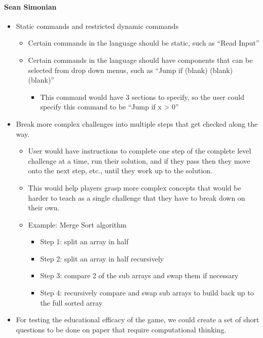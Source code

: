 \paragraph{Sean Simonian}
\begin{itemize}
  \item Static commands and restricted dynamic commands
  \begin{itemize}
    \item Certain commands in the language should be static, such as “Read
    Input”
    \item Certain commands in the language should have components that can be
    selected from drop down menus, such as “Jump if (blank) (blank) (blank)”
    \begin{itemize}
      \item This command would have 3 sections to specify, so the user could
      specify this command to be “Jump if x > 0”
    \end{itemize}
  \end{itemize}
  \item Break more complex challenges into multiple steps that get checked along
  the way.
  \begin{itemize}
    \item User would have instructions to complete one step of the complete
    level challenge at a time, run their solution, and if they pass then they
    move onto the next step, etc., until they work up to the solution.
    \item This would help players grasp more complex concepts that would be
    harder to teach as a single challenge that they have to break down on their
    own.
    \item Example: Merge Sort algorithm
    \begin{itemize}
      \item Step 1: split an array in half
      \item Step 2: split an array in half recursively
      \item Step 3: compare 2 of the sub arrays and swap them if necessary
      \item Step 4: recursively compare and swap sub arrays to build back up to
      the full sorted array
    \end{itemize}
  \end{itemize}
  \item For testing the educational efficacy of the game, we could create a set
  of short questions to be done on paper that require computational thinking.

\end{itemize}

